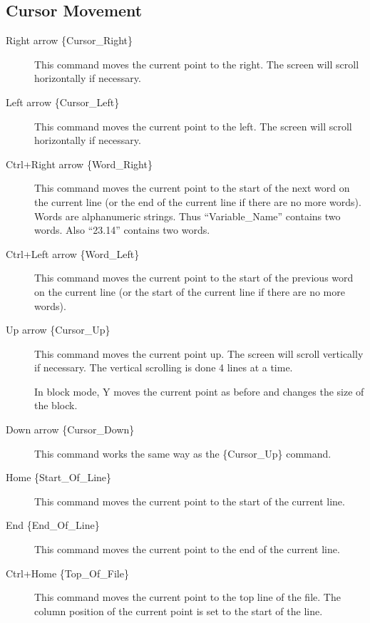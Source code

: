 \subsection{Cursor Movement}

\begin{description}

\item[Right arrow \{Cursor\_Right\}] This command moves the current point to the right. The
  screen will scroll horizontally if necessary.

\item[Left arrow \{Cursor\_Left\}] This command moves the current point to the left. The screen
  will scroll horizontally if necessary.

\item[Ctrl+Right arrow \{Word\_Right\}] This command moves the current point to the start of
  the next word on the current line (or the end of the current line if there are no more words).
  Words are alphanumeric strings. Thus ``Variable\_Name'' contains two words. Also ``23.14''
  contains two words.

\item[Ctrl+Left arrow \{Word\_Left\}] This command moves the current point to the start of the
  previous word on the current line (or the start of the current line if there are no more
  words).

\item[Up arrow \{Cursor\_Up\}] This command moves the current point up. The screen will scroll
  vertically if necessary. The vertical scrolling is done 4 lines at a time.

  In block mode, Y moves the current point as before and changes the size of the block.

\item[Down arrow \{Cursor\_Down\}] This command works the same way as the \{Cursor\_Up\}
  command.

\item[Home \{Start\_Of\_Line\}] This command moves the current point to the start of the current
  line.

\item[End \{End\_Of\_Line\}] This command moves the current point to the end of the current
  line.

\item[Ctrl+Home \{Top\_Of\_File\}] This command moves the current point to the top line of the
  file. The column position of the current point is set to the start of the line.


\end{description}
